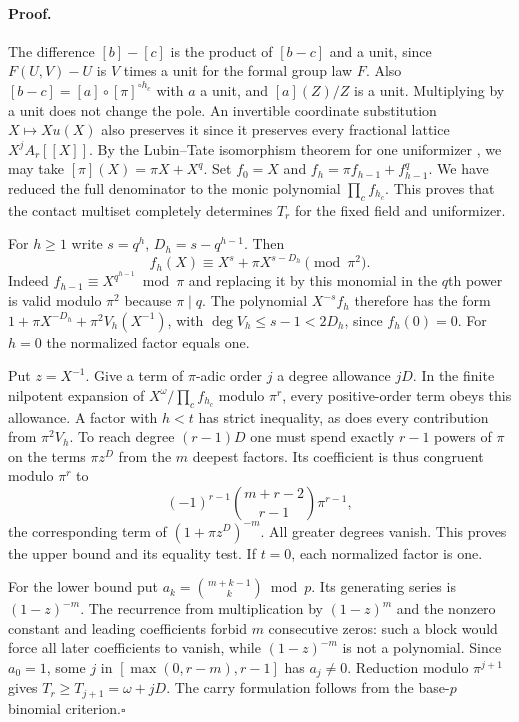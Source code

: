 \paragraph{Proof.}
The difference $[b]-[c]$ is the product of $[b-c]$ and a unit, since $F(U,V)-U$ is $V$ times a unit for the formal group law $F$. Also $[b-c]=[a]\circ[\pi]^{\circ h_c}$ with $a$ a unit, and $[a](Z)/Z$ is a unit. Multiplying by a unit does not change the pole. An invertible coordinate substitution $X\mapsto X u(X)$ also preserves it since it preserves every fractional lattice $X^jA_r[[X]]$. By the Lubin--Tate isomorphism theorem for one uniformizer \cite{lt}, we may take $[\pi](X)=\pi X+X^q$. Set $f_0=X$ and $f_h=\pi f_{h-1}+f_{h-1}^q$. We have reduced the full denominator to the monic polynomial $\prod_c f_{h_c}$. This proves that the contact multiset completely determines $T_r$ for the fixed field and uniformizer.

For $h\ge1$ write $s=q^h$, $D_h=s-q^{h-1}$. Then
\[
 f_h(X)\equiv X^s+\pi X^{s-D_h}\pmod{\pi^2}.
\]
Indeed $f_{h-1}\equiv X^{q^{h-1}}\bmod\pi$ and replacing it by this monomial in the $q$th power is valid modulo $\pi^2$ because $\pi\mid q$. The polynomial $X^{-s}f_h$ therefore has the form $1+\pi X^{-D_h}+\pi^2 V_h(X^{-1})$, with $\deg V_h\le s-1<2D_h$, since $f_h(0)=0$. For $h=0$ the normalized factor equals one.

Put $z=X^{-1}$. Give a term of $\pi$-adic order $j$ a degree allowance $jD$. In the finite nilpotent expansion of $X^{\omega}/\prod_c f_{h_c}$ modulo $\pi^r$, every positive-order term obeys this allowance. A factor with $h<t$ has strict inequality, as does every contribution from $\pi^2V_h$. To reach degree $(r-1)D$ one must spend exactly $r-1$ powers of $\pi$ on the terms $\pi z^D$ from the $m$ deepest factors. Its coefficient is thus congruent modulo $\pi^r$ to
\[
 (-1)^{r-1}\binom{m+r-2}{r-1}\pi^{r-1},
\]
the corresponding term of $(1+\pi z^D)^{-m}$. All greater degrees vanish. This proves the upper bound and its equality test. If $t=0$, each normalized factor is one.

For the lower bound put $a_k=\binom{m+k-1}{k}\bmod p$. Its generating series is $(1-z)^{-m}$. The recurrence from multiplication by $(1-z)^m$ and the nonzero constant and leading coefficients forbid $m$ consecutive zeros: such a block would force all later coefficients to vanish, while $(1-z)^{-m}$ is not a polynomial. Since $a_0=1$, some $j$ in $[\max(0,r-m),r-1]$ has $a_j\ne0$. Reduction modulo $\pi^{j+1}$ gives $T_r\ge T_{j+1}=\omega+jD$. The carry formulation follows from the base-$p$ binomial criterion.\hfill$\square$

